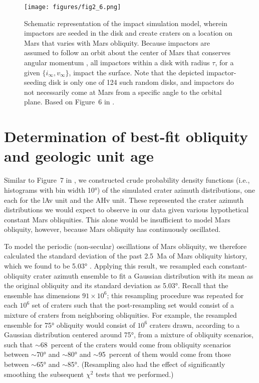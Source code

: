\documentclass{ucetd}
\begin{document}
\begin{figure}
    \texttt{[image: figures/fig2\_6.png]}
    \caption[Schematic representation of the impact simulation model]{Schematic representation of the impact simulation model, wherein impactors are seeded in the disk and create craters on a location on Mars that varies with Mars obliquity. Because impactors are assumed to follow an orbit about the center of Mars that conserves angular momentum \citep{lefeuvre2008a}, all impactors within a disk with radius $\tau$, for a given $\{i_{\infty},v_{\infty}\}$, impact the surface. Note that the depicted impactor-seeding disk is only one of 124 such random disks, and impactors do not necessarily come at Mars from a specific angle to the orbital plane. Based on Figure~6 in \citet{holo2018a}.}
    \label{fig:2-6}
\end{figure}

\section{Determination of best-fit obliquity and geologic unit age}
\label{section:2-4}

Similar to Figure~7 in \citet{holo2018a}, we constructed crude probability density functions (i.e., histograms with bin width 10°) of the simulated crater azimuth distributions, one each for the lAv unit and the AHv unit. These represented the crater azimuth distributions we would expect to observe in our data given various hypothetical constant Mars obliquities. This alone would be insufficient to model Mars obliquity, however, because Mars obliquity has continuously oscillated.

To model the periodic (non-secular) oscillations of Mars obliquity, we therefore calculated the standard deviation of the past 2.5~Ma of Mars obliquity history, which we found to be 5.03° \citep{laskar2010a}. Applying this result, we resampled each constant-obliquity crater azimuth ensemble to fit a Gaussian distribution with its mean as the original obliquity and its standard deviation as 5.03°. Recall that the ensemble has dimensions $91\times10^6$; this resampling procedure was repeated for each $10^6$ set of craters such that the post-resampling set would consist of a mixture of craters from neighboring obliquities. For example, the resampled ensemble for 75° obliquity would consist of $10^6$ craters drawn, according to a Gaussian distribution centered around 75°, from a mixture of obliquity scenarios, such that $\sim$68~percent of the craters would come from obliquity scenarios between $\sim$70° and $\sim$80° and $\sim$95~percent of them would come from those between $\sim$65° and $\sim$85°. (Resampling also had the effect of significantly smoothing the subsequent $\chi^2$ tests that we performed.)
\end{document}
